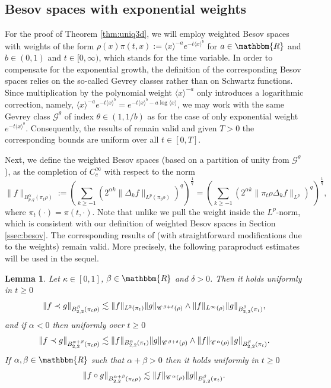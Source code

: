 \documentclass[a4paper,11pt]{article}
\renewcommand{\geq}{\geqslant}
\newcommand{\assign}{:=}
\newtheorem{lemma}[theorem]{Lemma}
\numberwithin{equation}{section}
\newcommand{\CC}{\mathscr{C} \hspace{.1em}}
\newcommand{\8}{\infty}
\begin{document}
\subsection{Besov spaces with exponential weights}
\label{ss:b}

For the proof of Theorem \ref{thm:uniq3d}, we will employ weighted Besov
spaces with weights of the form $\rho(x)\pi(t,x):=\langle x \rangle^{- a} e^{- t \langle x
\rangle^b}$ for $a \in \mathbbm{R}$ and $b \in (0, 1)$ and $t\in [0,\8)$, which stands for the time variable. In order to compensate for the exponential growth, the definition of the
corresponding Besov spaces relies on the so-called Gevrey classes rather than
on Schwartz functions. Since multiplication by the polynomial weight $\langle
x \rangle^{- a}$ only introduces a logarithmic correction, namely, $\langle x
\rangle^{- a} e^{- t \langle x \rangle^b} = e^{- t \langle x \rangle^b - a
\log \langle x \rangle}$, we may work with the same Gevrey class
$\mathcal{G}^{\theta}$ of index $\theta \in (1, 1 / b)$ as for the case of only exponential weight $e^{- t \langle x
\rangle^b}$.
Consequently, the  results of \cite[Section~2]{MW17} remain valid and given $T>0$ the corresponding bounds are uniform over all $t\in [0,T]$.

Next,  we define the weighted Besov spaces (based on a partition of
unity from $\mathcal{G}^{\theta}$), as the completion of $C^{\infty}_c$ with
respect to the norm
\[ \| f \|_{B^{\alpha}_{p, q} (\pi_{t}\rho)} \assign \left( \sum_{k \geqslant - 1}
   (2^{\alpha k} \| \Delta_k f \|_{L^p (\pi_{t}\rho)})^q \right)^{\frac{1}{q}} =
   \left( \sum_{k \geqslant - 1} (2^{\alpha k} \| \pi_{t}\rho \Delta_k f \|_{L^p})^q
   \right)^{\frac{1}{q}}, \]
where $\pi_{t}(\cdot)=\pi(t,\cdot)$.
Note that unlike \cite{MW17} we pull the weight inside the $L^p$-norm, which is consistent with our definition of weighted Besov spaces in Section \ref{ssec:besov}. The corresponding results of \cite[Section 3.3]{MW17} (with straightforward modifications due to the weights) remain valid.
More precisely, the following paraproduct estimates will be used in the sequel.

\begin{lemma}
  \label{lem:par1}Let $\kappa \in [0, 1]$, $\beta \in \mathbbm{R}$ and $\delta > 0$. Then it
  holds uniformly in $t\geq 0$
  \[ \| f \prec g \|_{B_{2, 2}^{\beta} (\pi_{t} \rho)} \lesssim \| f \|_{L^2
     (\pi_{t})} \| g \|_{\CC^{\beta + \delta} (\rho)}\wedge \| f
     \|_{L^{\infty} (\rho)} \| g \|_{B^{\beta}_{2, 2} (\pi_{t})}, \]
  and if $\alpha < 0$ then uniformly over $t\geq 0$
    \[ \| f \prec g \|_{B_{2, 2}^{\alpha + \beta} (\pi_{t} \rho)} \lesssim \| f
     \|_{B^{\alpha}_{2, 2} (\pi_{t})} \| g \|_{\CC^{\beta+\delta} (\rho)} \wedge\| f
     \|_{\CC^{\alpha} (\rho)} \| g \|_{B^{\beta}_{2, 2} (\pi_{t})} . \]
  If $\alpha, \beta \in \mathbbm{R}$ such that $\alpha + \beta > 0$ then it
  holds uniformly in $t\geq 0$
  \[ \| f \circ g \|_{B_{2, 2}^{\alpha + \beta} (\pi_{t} \rho^{})} \lesssim \| f
     \|_{\CC^{\alpha} (\rho)} \| g \|_{B^{\beta}_{2, 2} (\pi_{t})} . \]
\end{lemma}
\end{document}
